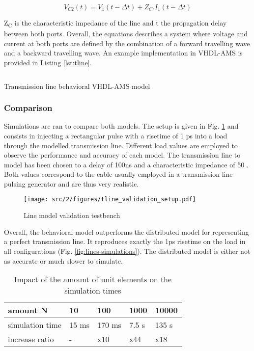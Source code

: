 \begin{equation}
V_{C2}(t) = V_{1}(t - \Delta t) + Z_{C}.I_{1}(t - \Delta t)
\label{eq:beh-line-2}
\end{equation}

Z\textsubscript{C} is the characteristic impedance of the line and \textDelta{}t the propagation delay between both ports.
Overall, the equations describes a system where voltage and current at both ports are defined by the combination of a forward travelling wave and a backward travelling wave.
An example implementation in VHDL-AMS is provided in Listing \ref{lst:tline}.

\begin{code}
\inputminted[frame=single]{VHDL}{src/2/snippets/tline.vhdl}
\label{lst:tline}
\caption{Transmission line behavioral VHDL-AMS model}
\end{code}


\subsubsection{Comparison}

Simulations are ran to compare both models.
The setup is given in Fig. \ref{fig:lines-testbench} and consists in injecting a rectangular pulse with a risetime of 1 ps into a load through the modelled transmission line.
Different load values are employed to observe the performance and accuracy of each model.
The transmission line to model has been chosen to a delay of 100ns and a characteristic impedance of 50 \textOmega.
Both values correspond to the cable usually employed in a transmission line pulsing generator and are thus very realistic.


\begin{figure}[!h]
  \centering
  \texttt{[image: src/2/figures/tline\_validation\_setup.pdf]}
  \caption{Line model validation testbench}
  \label{fig:lines-testbench}
\end{figure}

Overall, the behavioral model outperforms the distributed model for representing a perfect transmission line.
It reproduces exactly the 1ps risetime on the load in all configurations (Fig. \ref{fig:lines-simulations}).
The distributed model is either not as accurate or much slower to simulate.

\begin{table}[!h]
\centering
\begin{tabular}{@{}lllll@{}}
\toprule
amount N         &  10           & 100        &  1000      &   10000    \\ \midrule
simulation time  &  15 ms        & 170 ms     &  7.5 s     &   135 s    \\
increase ratio   &  -            & x10        &  x44       &   x18      \\
\bottomrule
\end{tabular}
\caption{Impact of the amount of unit elements on the simulation times}
\label{tab:tline-impact-simulation-time}
\end{table}

